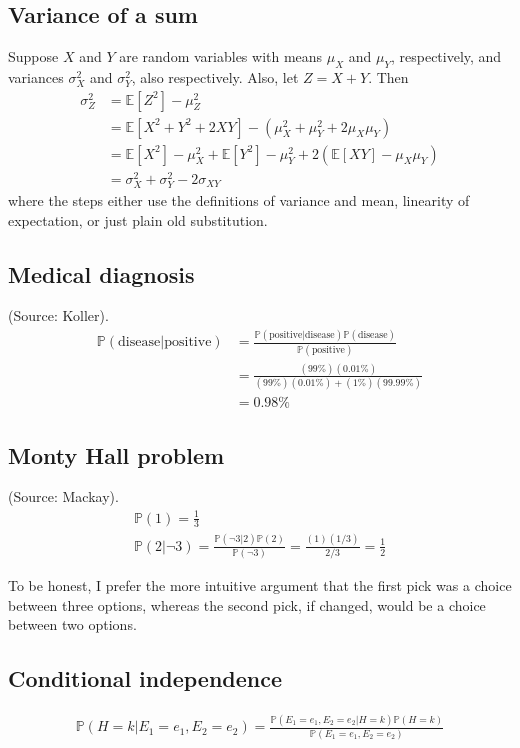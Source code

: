 \documentclass{article}
\begin{document}
\subsection{Variance of a sum}
Suppose $X$ and $Y$ are random variables with means $\mu_X$ and $\mu_Y$, respectively, and variances $\sigma_X^2$ and $\sigma_Y^2$, also respectively. Also, let $Z = X + Y$. Then
\begin{align*}
\sigma_Z^2 &= \mathbb{E}[Z^2] - \mu_Z^2\\
&= \mathbb{E}[X^2 + Y^2 + 2XY] - (\mu_X^2 + \mu_Y^2 + 2\mu_X\mu_Y)\\
&= \mathbb{E}[X^2] - \mu_X^2 + \mathbb{E}[Y^2] - \mu_Y^2 + 2(\mathbb{E}[XY] - \mu_X\mu_Y)\\
&= \sigma_X^2 + \sigma_Y^2 - 2\sigma_{XY}
\end{align*}
where the steps either use the definitions of variance and mean, linearity of expectation, or just plain old substitution.

\subsection{Medical diagnosis}
(Source: Koller).
\begin{align*}
\mathbb{P}(\mathrm{disease}|\mathrm{positive}) &= \frac{\mathbb{P}(\mathrm{positive}|\mathrm{disease}) \mathbb{P}(\mathrm{disease})}{\mathbb{P}(\mathrm{positive})}\\
&= \frac{(99\%)(0.01\%)}{(99\%)(0.01\%)+(1\%)(99.99\%)}\\ &= 0.98\%
\end{align*}

\subsection{Monty Hall problem}
(Source: Mackay).
\begin{gather*}
\mathbb{P}(1) = \frac{1}{3}\\
\mathbb{P}(2|\neg 3) = \frac{\mathbb{P}(\neg 3|2)\mathbb{P}(2)}{\mathbb{P}(\neg 3)} = \frac{(1)(1/3)}{2/3} = \frac{1}{2}
\end{gather*}

To be honest, I prefer the more intuitive argument that the first pick was a choice between three options, whereas the second pick, if changed, would be a choice between two options.

\subsection{Conditional independence}
\begin{gather*}
\mathbb{P}(H=k|E_1=e_1,E_2=e_2) = \frac{\mathbb{P}(E_1=e_1,E_2=e_2|H=k)\mathbb{P}(H=k)}{\mathbb{P}(E_1=e_1,E_2=e_2)}
\end{gather*}
\end{document}
